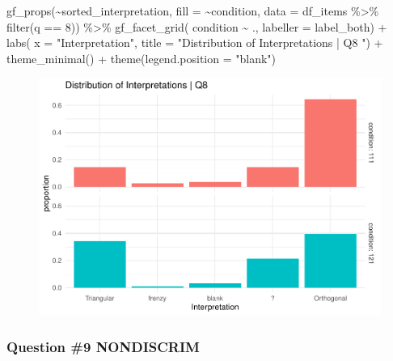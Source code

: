 \documentclass[
  letterpaper,
  DIV=11,
  numbers=noendperiod]{scrreprt}
\newenvironment{Shaded}{\begin{snugshade}}{\end{snugshade}}
\newcommand{\AttributeTok}[1]{\textcolor[rgb]{0.40,0.45,0.13}{#1}}
\newcommand{\DecValTok}[1]{\textcolor[rgb]{0.68,0.00,0.00}{#1}}
\newcommand{\FunctionTok}[1]{\textcolor[rgb]{0.28,0.35,0.67}{#1}}
\newcommand{\NormalTok}[1]{\textcolor[rgb]{0.00,0.23,0.31}{#1}}
\newcommand{\SpecialCharTok}[1]{\textcolor[rgb]{0.37,0.37,0.37}{#1}}
\newcommand{\StringTok}[1]{\textcolor[rgb]{0.13,0.47,0.30}{#1}}
\begin{document}
\begin{Shaded}
\begin{Highlighting}[]
\FunctionTok{gf\_props}\NormalTok{(}\SpecialCharTok{\textasciitilde{}}\NormalTok{sorted\_interpretation, }\AttributeTok{fill =} \SpecialCharTok{\textasciitilde{}}\NormalTok{condition, }\AttributeTok{data =}\NormalTok{ df\_items }\SpecialCharTok{\%\textgreater{}\%} \FunctionTok{filter}\NormalTok{(q }\SpecialCharTok{==} \DecValTok{8}\NormalTok{)) }\SpecialCharTok{\%\textgreater{}\%} 
  \FunctionTok{gf\_facet\_grid}\NormalTok{( condition }\SpecialCharTok{\textasciitilde{}}\NormalTok{ ., }\AttributeTok{labeller =}\NormalTok{ label\_both) }\SpecialCharTok{+} 
  \FunctionTok{labs}\NormalTok{( }\AttributeTok{x =} \StringTok{"Interpretation"}\NormalTok{, }\AttributeTok{title =} \StringTok{"Distribution of Interpretations | Q8 "}\NormalTok{) }\SpecialCharTok{+} 
  \FunctionTok{theme\_minimal}\NormalTok{() }\SpecialCharTok{+} \FunctionTok{theme}\NormalTok{(}\AttributeTok{legend.position =} \StringTok{"blank"}\NormalTok{)}
\end{Highlighting}
\end{Shaded}

\begin{figure}[H]

{\centering \includegraphics{analysis/SGC3A/2_sgc3A_scoring_files/figure-pdf/Q8-distribution-2.pdf}

}

\end{figure}

\hypertarget{question-9-nondiscrim}{%
\subsubsection{Question \#9 NONDISCRIM}\label{question-9-nondiscrim}}
\end{document}
